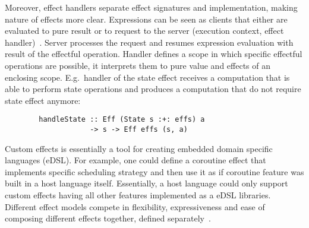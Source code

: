 \documentclass[conference]{IEEEtran}
\begin{document}
%

    Moreover, effect handlers separate effect signatures and implementation, making nature of effects more clear.
    Expressions can be seen as clients that either are evaluated to pure result or to request to the server (execution context, effect handler)~\cite{extensible-effects}.
    Server processes the request and resumes expression evaluation with result of the effectful operation.
    Handler defines a scope in which specific effectful operations are possible, it interprets them to pure value and effects of an enclosing scope.
    E.g.\ handler of the state effect receives a computation that is able to perform state operations and produces a computation that do not require state effect anymore:
    \begin{verbatim}
        handleState :: Eff (State s :+: effs) a
                    -> s -> Eff effs (s, a)
    \end{verbatim}

    Custom effects is essentially a tool for creating embedded domain specific languages (eDSL).
    For example, one could define a coroutine effect that implements specific scheduling strategy and then use it as if coroutine feature was built in a host language itself.
    Essentially, a host language could only support custom effects having all other features implemented as a eDSL libraries.
    Different effect models compete in flexibility, expressiveness and ease of composing different effects together, defined separately~\cite{transformers, extensible-effects, hoe}.
\end{document}
